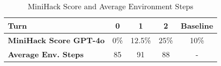 \begin{table}[h]
	\centering
	\renewcommand{\arraystretch}{1.5}
	\begin{tabular}{p{4cm}ccc|c}
		\toprule \textbf{Turn}                  & \textbf{0} & \textbf{1} & \textbf{2} & \textbf{Baseline} \\
		\midrule \textbf{MiniHack Score GPT-4o} & 0\%        & 12.5\%     & 25\%       & 10\%              \\
		\midrule \textbf{Average Env. Steps}    & 85         & 91         & 88         & -                 \\
		\bottomrule
	\end{tabular}
	\caption{MiniHack Score and Average Environment Steps}
	\label{tab:heldout_mini}
\end{table}